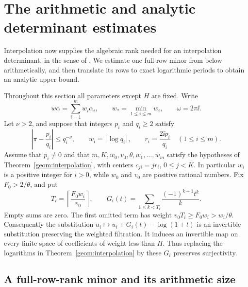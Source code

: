 \section{The arithmetic and analytic determinant estimates}
\label{det:section}

Interpolation now supplies the algebraic rank needed for an
interpolation determinant, in the sense of
\cite[Section~6]{laurent1991}. We estimate one full-row minor from
below arithmetically, and then translate its rows to exact logarithmic
periods to obtain an analytic upper bound.

Throughout this section all parameters except $H$ are fixed.  Write
\[
 w\alpha=\sum_{i=1}^m w_i\alpha_i,
 \qquad w_* =\min_{1\le i\le m}w_i,
 \qquad \omega=2\pi\ii.
\]
Let $\nu>2$, and suppose that integers $p_i$ and $q_i\ge2$ satisfy
\begin{equation}
 \left|\pi-\frac{p_i}{q_i}\right|\le q_i^{-\nu},
 \qquad w_i=\lceil\log q_i\rceil,
 \qquad r_i=\frac{2\ii p_i}{q_i}
 \quad(1\le i\le m).
 \label{det:approximations}
\end{equation}
Assume that $p_i\ne0$ and that $m,K,w_0,v_0,\theta,w_1,\ldots,w_m$
satisfy the hypotheses of Theorem~\ref{geom:interpolation}, with centers
$c_{ji}=jr_i$, $0\le j<K$.  In particular $w_i$ is a positive integer
for $i>0$, while $w_0$ and $v_0$ are positive rational numbers.  Fix
$F_0>2/\theta$, and put
\begin{equation}
 T_i=\left\lceil\frac{F_0w_i}{v_0}\right\rceil,
 \qquad
 G_i(t)=\sum_{1\le k<T_i}\frac{(-1)^{k+1}t^k}{k}.
 \label{det:truncations}
\end{equation}
Empty sums are zero.  The first omitted term has weight
$v_0T_i\ge F_0w_i>w_i/\theta$.  Consequently the substitution
$u_i\mapsto u_i+G_i(t)-\log(1+t)$ is an invertible substitution preserving
the weighted filtration.  It induces an invertible map on every finite
space of coefficients of weight less than $H$.  Thus replacing the
logarithms in Theorem~\ref{geom:interpolation} by these $G_i$ preserves
surjectivity.

\subsection{A full-row-rank minor and its arithmetic size}

